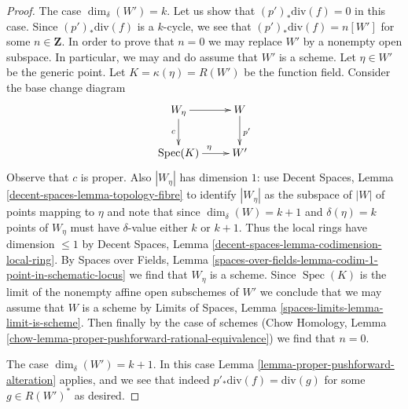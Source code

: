 \documentclass[10pt,a4paper]{amsart}
\theoremstyle{plain}
\theoremstyle{definition}
\theoremstyle{remark}
\numberwithin{equation}{subsection}
\def\Spec{\mathop{\mathrm{Spec}}}
\begin{document}
\begin{proof}
\medskip\noindent
The case $\dim_\delta(W') = k$. Let us show that $(p')_*\text{div}(f) = 0$
in this case. Since $(p')_*\text{div}(f)$ is a $k$-cycle, we see
that $(p')_*\text{div}(f) = n[W']$ for some $n \in \mathbf{Z}$.
In order to prove that $n = 0$ we may replace $W'$ by
a nonempty open subspace. In particular, we may and
do assume that $W'$ is a scheme. Let $\eta \in W'$ be the generic point.
Let $K = \kappa(\eta) = R(W')$ be the function field.
Consider the base change diagram
$$
\xymatrix{
W_\eta \ar[r] \ar[d]_c & W \ar[d]^{p'} \\
\Spec(K) \ar[r]^\eta & W'
}
$$
Observe that $c$ is proper. Also $|W_\eta|$ has dimension $1$:
use Decent Spaces, Lemma \ref{decent-spaces-lemma-topology-fibre}
to identify $|W_\eta|$ as the subspace of $|W|$ of points mapping to $\eta$
and note that since $\dim_\delta(W) = k + 1$ and $\delta(\eta) = k$
points of $W_\eta$ must have $\delta$-value either $k$ or $k + 1$.
Thus the local rings have dimension $\leq 1$ by
Decent Spaces, Lemma \ref{decent-spaces-lemma-codimension-local-ring}.
By Spaces over Fields, Lemma
\ref{spaces-over-fields-lemma-codim-1-point-in-schematic-locus}
we find that $W_\eta$ is a scheme.
Since $\Spec(K)$ is the limit of the nonempty affine open subschemes of $W'$
we conclude that we may assume that $W$ is a scheme by
Limits of Spaces, Lemma \ref{spaces-limits-lemma-limit-is-scheme}.
Then finally by the case of schemes
(Chow Homology, Lemma \ref{chow-lemma-proper-pushforward-rational-equivalence})
we find that $n = 0$.

\medskip\noindent
The case $\dim_\delta(W') = k + 1$. In this case
Lemma \ref{lemma-proper-pushforward-alteration} applies,
and we see that indeed $p'_*\text{div}(f) = \text{div}(g)$
for some $g \in R(W')^*$ as desired.
\end{proof}
\end{document}
